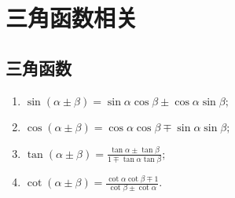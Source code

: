 \documentclass[../../main.tex]{subfiles}%
\begin{document}
\section{三角函数相关}

\subsection{三角函数}

\begin{theorem}[两角和差公式]\label{theorem:三角函数和差角公式}
\begin{enumerate}[(1)]
\item \(\sin(\alpha \pm \beta) = \sin\alpha\cos\beta \pm \cos\alpha\sin\beta;\)
\item \(\cos(\alpha \pm \beta) = \cos\alpha\cos\beta \mp \sin\alpha\sin\beta;\)
\item \(\tan(\alpha \pm \beta) = \frac{\tan\alpha \pm \tan\beta}{1 \mp \tan\alpha\tan\beta};\)
\item \(\cot(\alpha \pm \beta) = \frac{\cot\alpha\cot\beta \mp 1}{\cot\beta \pm \cot\alpha}.\)
\end{enumerate}
\end{theorem}
\end{document}
